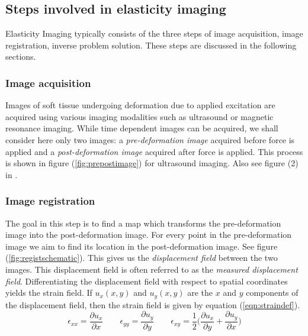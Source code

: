 \documentclass[12pt]{article}
\newcommand{\beq}{\begin{equation}}
\newcommand{\eeq}{\end{equation}}
\newcommand{\pdd}[2]{\frac{\partial{{#1}}}{\partial{#2}}}
\begin{document}
\subsection{Steps involved in elasticity imaging}
Elasticity Imaging typically consists of the three steps of image acquisition, image registration, inverse problem solution. These steps are discussed in the following sections.
\subsubsection{Image acquisition} Images of soft tissue undergoing deformation due to applied excitation are acquired using various imaging modalities such as ultrasound or magnetic resonance imaging. While time dependent images can be acquired, we shall consider here only two images: a \textit{pre-deformation image} acquired before force is applied and a \textit{post-deformation image} acquired after force is applied. This process is shown in figure (\ref{fig:prepostimage}) for ultrasound imaging. Also see figure (2) in \cite{paper:konofagou2004}.
\subsubsection{Image registration} The goal in this step is to find a map which transforms the pre-deformation image into the post-deformation image. For every point in the pre-deformation image we aim to find its location in the post-deformation image. See figure (\ref{fig:registschematic}). This gives us the \textit{displacement field} between the two images. This displacement field is often referred to as the \textit{measured displacement field}. Differentiating the displacement field with respect to spatial coordinates yields the strain field. If $u_x(x,y)$ and $u_{y}(x,y)$ are the $x$ and $y$ components of the displacement field, then the strain field is given by equation (\ref{eqn:straindef}).
\beq
\label{eqn:straindef}
\epsilon_{xx} = \pdd{u_{x}}{x} \qquad \epsilon_{yy} = \pdd{u_{y}}{y} \qquad \epsilon_{xy} = \frac{1}{2}\Big(\pdd{u_{x}}{y} + \pdd{u_{y}}{x}\Big)
\eeq
\end{document}
